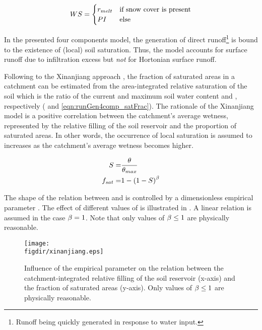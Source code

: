 \begin{align} \label{eqn:runGen4comp_waterSupply}
  WS =
  \begin{cases}
    r_{melt} & \text{if snow cover is present} \\
    PI & \text{else} \\
  \end{cases}
\end{align}

In the presented four components model, the generation of direct runoff\footnote{Runoff being quickly generated in response to water input.} is bound to the existence of (local) soil saturation. Thus, the model accounts for surface runoff due to infiltration excess but \emph{not} for Hortonian surface runoff.

Following to the Xinanjiang approach \citep{Zhao1980}, the fraction of saturated areas \satFrac{} in a catchment can be estimated from the area-integrated relative saturation of the soil \relSat{} which is the ratio of the current and maximum soil water content \soilWaterContent{} and \soilWaterContentMax{}, respectively ( and \ref{eqn:runGen4comp_satFrac}). The rationale of the Xinanjiang model is a positive correlation between the catchment's average wetness, represented by the relative filling of the soil reservoir and the proportion of saturated areas. In other words, the occurrence of local saturation is assumed to increases as the catchment's average wetness becomes higher.

\begin{align}
  S =& \frac{\theta}{\theta_{max}} \label{eqn:runGen4comp_relativeSaturation} \\
  f_{sat}=& 1 - \left( 1 - S \right) ^ {{\beta}} \label{eqn:runGen4comp_satFrac}
\end{align}

The shape of the relation between \relSat{} and \satFrac{} is controlled by a dimensionless empirical parameter \expSatFrac{}. The effect of different values of \expSatFrac{} is illustrated in . A linear relation is assumed in the case ${\beta}{}=1$. Note that only values of ${\beta}{} \le 1$ are physically reasonable.

\begin{figure}
  \texttt{[image: \\figdir/xinanjiang.eps]}
  \caption[Influence of the empirical parameter \expSatFrac{}.]{Influence of the empirical parameter \expSatFrac{} on the relation between the catchment-integrated relative filling of the soil reservoir (x-axis) and the fraction of saturated areas \satFrac{} (y-axis). Only values of ${\beta}{} \le 1$ are physically reasonable. \label{fig:runGen4comp_expSatFrac}}
\end{figure}

